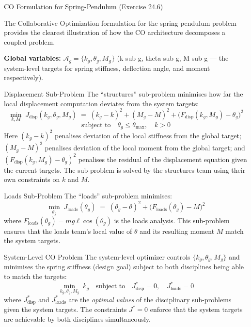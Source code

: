 \documentclass[aspectratio=169,10pt]{beamer}
\begin{document}
\begin{frame}[allowframebreaks]{CO Formulation for Spring-Pendulum (Exercise 24.6)}

  The Collaborative Optimization formulation for the spring-pendulum
  problem provides the clearest illustration of how the CO architecture
  decomposes a coupled problem.

  \textbf{Global variables:} $\mathcal{A}_g = \{k_g, \theta_g, M_g\}$
  (k sub g, theta sub g, M sub g --- the system-level targets for spring
  stiffness, deflection angle, and moment respectively).

  \begin{block}{Displacement Sub-Problem}
    The ``structures'' sub-problem minimises how far the local
    displacement computation deviates from the system targets:
    \[
      \min_{k, M}\; J_{\mathrm{disp}}(k_g, \theta_g, M_g)
      \;=\; (k_g - k)^2 + (M_g - M)^2
         + \bigl(F_{\mathrm{disp}}(k_g, M_g) - \theta_g\bigr)^2
    \]
    \[
      \text{subject to} \quad \theta_g \leq \theta_{\max}, \quad k > 0
    \]
    Here $(k_g - k)^2$ penalises deviation of the local stiffness from the
    global target; $(M_g - M)^2$ penalises deviation of the local moment
    from the global target; and $(F_{\mathrm{disp}}(k_g, M_g) - \theta_g)^2$
    penalises the residual of the displacement equation given the current
    targets.  The sub-problem is solved by the structures team using their
    own constraints on $k$ and $M$.
  \end{block}

  \begin{block}{Loads Sub-Problem}
    The ``loads'' sub-problem minimises:
    \[
      \min_{\theta_g}\; J_{\mathrm{loads}}(\theta_g)
      \;=\; (\theta_g - \theta)^2
         + \bigl(F_{\mathrm{loads}}(\theta_g) - M\bigr)^2
    \]
    where $F_{\mathrm{loads}}(\theta_g) = mg\ell\cos(\theta_g)$ is the
    loads analysis.  This sub-problem ensures that the loads team's local
    value of $\theta$ and its resulting moment $M$ match the system targets.
  \end{block}

  \begin{block}{System-Level CO Problem}
    The system-level optimizer controls $\{k_g, \theta_g, M_g\}$ and
    minimises the spring stiffness (design goal) subject to both disciplines
    being able to match the targets:
    \[
      \min_{k_g, \theta_g, M_g}\; k_g
      \quad \text{subject to} \quad
      J_{\mathrm{disp}}^* = 0, \quad J_{\mathrm{loads}}^* = 0
    \]
    where $J_{\mathrm{disp}}^*$ and $J_{\mathrm{loads}}^*$ are the
    \emph{optimal values} of the disciplinary sub-problems given the
    system targets.  The constraints $J^* = 0$ enforce that the system
    targets are achievable by both disciplines simultaneously.
  \end{block}


\end{frame}
\end{document}
